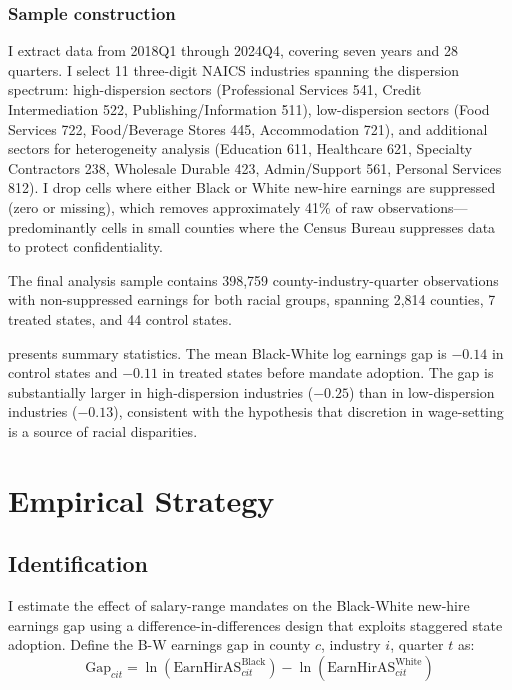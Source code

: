 \documentclass[12pt]{article}
\begin{document}
\subsubsection*{Sample construction} I extract data from 2018Q1 through 2024Q4, covering seven years and 28 quarters. I select 11 three-digit NAICS industries spanning the dispersion spectrum: high-dispersion sectors (Professional Services 541, Credit Intermediation 522, Publishing/Information 511), low-dispersion sectors (Food Services 722, Food/Beverage Stores 445, Accommodation 721), and additional sectors for heterogeneity analysis (Education 611, Healthcare 621, Specialty Contractors 238, Wholesale Durable 423, Admin/Support 561, Personal Services 812). I drop cells where either Black or White new-hire earnings are suppressed (zero or missing), which removes approximately 41\% of raw observations---predominantly cells in small counties where the Census Bureau suppresses data to protect confidentiality.

The final analysis sample contains 398,759 county-industry-quarter observations with non-suppressed earnings for both racial groups, spanning 2,814 counties, 7 treated states, and 44 control states.



 presents summary statistics. The mean Black-White log earnings gap is $-0.14$ in control states and $-0.11$ in treated states before mandate adoption. The gap is substantially larger in high-dispersion industries ($-0.25$) than in low-dispersion industries ($-0.13$), consistent with the hypothesis that discretion in wage-setting is a source of racial disparities.

\section{Empirical Strategy}

\subsection{Identification}

I estimate the effect of salary-range mandates on the Black-White new-hire earnings gap using a difference-in-differences design that exploits staggered state adoption. Define the B-W earnings gap in county $c$, industry $i$, quarter $t$ as:
\begin{equation}
\text{Gap}_{cit} = \ln(\text{EarnHirAS}^{\text{Black}}_{cit}) - \ln(\text{EarnHirAS}^{\text{White}}_{cit})
\end{equation}
\end{document}
